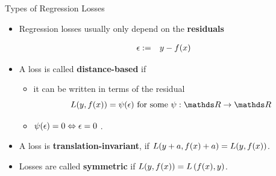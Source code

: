 \begin{vbframe}{Types of Regression Losses}

\begin{itemize}
  \item Regression losses usually only depend on the \textbf{ residuals}

  \vspace*{-0.5cm}

  \begin{eqnarray*}
    \eps &:=& y - \fx %
  \end{eqnarray*}

  \item A loss is called \textbf{distance-based} if
  \begin{itemize}
    \item it can be written in terms of the residual
    $$
      \Lxy = \psi (\eps) \text{ for some } \psi: \R \to \R
    $$
    \item $\psi(\epsilon) = 0 \Leftrightarrow \epsilon = 0$ .
  \end{itemize}
  \item A loss is \textbf{translation-invariant}, if $L(y + a, f(x) + a) = L(y, f(x))$.
  \item Losses are called \textbf{symmetric} if $L(y, f(x)) = L\left(f(x), y\right)$. 
\end{itemize}

\end{vbframe}

